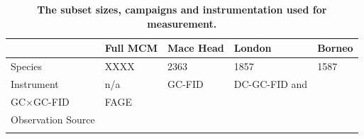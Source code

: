 \begin{table}[H]
\begin{tabular}{l|llll}
                   & Full MCM   & Mace Head      & London      & Borneo        \\ \hline
Species            & XXXX       & 2363           & 1857        & 1587          \\
Instrument            & n/a       & GC-FID           &   DC-GC-FID and\\ GC$\times$GC-FID      & FAGE          \\
Observation Source & \cite{mcm} & \cite{lewis97} & \cite{clfo}\\\cite{dunmore} & \cite{borneo}\\
\end{tabular}
\caption{\textbf{The subset sizes, campaigns and instrumentation used for measurement.}}
\label{table:subsetsize}
\end{table}



